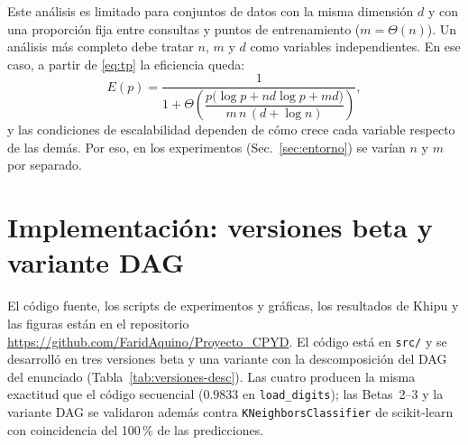 \documentclass[11pt,a4paper]{article}
\newcommand{\ntr}{n}   %
\newcommand{\mte}{m}   %
\begin{document}
Este análisis es limitado para conjuntos de datos con la misma dimensión $d$ y con una proporción
fija entre consultas y puntos de entrenamiento ($\mte=\Theta(\ntr)$). Un análisis más completo debe
tratar $\ntr$, $\mte$ y $d$ como variables independientes. En ese caso, a partir de \eqref{eq:tp} la
eficiencia queda:
\begin{equation}
  E(p)=\frac{1}{1+\Theta\!\left(\dfrac{p\big(\log p+\ntr d\log p+\mte d\big)}
  {\mte\,\ntr\,(d+\log\ntr)}\right)},\label{eq:eff-general}
\end{equation}
y las condiciones de escalabilidad dependen de cómo crece cada variable respecto de las demás. Por
eso, en los experimentos (Sec.~\ref{sec:entorno}) se varían $\ntr$ y $\mte$ por separado.

\section{Implementación: versiones beta y variante DAG}
\label{sec:betas}
El código fuente, los scripts de experimentos y gráficas, los resultados de Khipu y las figuras están
en el repositorio \url{https://github.com/FaridAquino/Proyecto_CPYD}.
El código está en \texttt{src/} y se desarrolló en tres versiones beta y una variante con la
descomposición del DAG del enunciado (Tabla~\ref{tab:versiones-desc}). Las cuatro producen la misma
exactitud que el código secuencial ($0.9833$ en \texttt{load\_digits}); las Betas~2--3 y la
variante DAG se validaron además contra \texttt{KNeighborsClassifier} de
scikit-learn~\cite{pedregosa2011} con coincidencia del 100\,\% de las predicciones.
\end{document}
